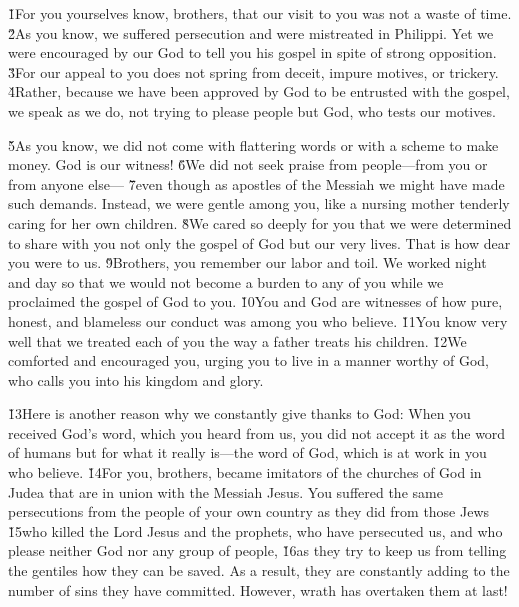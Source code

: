 \v{1}For you yourselves know, brothers, that our visit to you was not a waste of time. \v{2}As you know, we suffered persecution and were mistreated in Philippi. Yet we were encouraged by our God to tell you his gospel in spite of strong opposition. \v{3}For our appeal to you does not spring from deceit, impure motives, or trickery. \v{4}Rather, because we have been approved by God to be entrusted with the gospel, we speak as we do, not trying to please people but God, who tests our motives.

\v{5}As you know, we did not come with flattering words or with a scheme to make money. God is our witness! \v{6}We did not seek praise from people---from you or from anyone else--- \v{7}even though as apostles of the Messiah we might have made such demands. Instead, we were gentle among you, like a nursing mother tenderly caring for her own children. \v{8}We cared so deeply for you that we were determined to share with you not only the gospel of God but our very lives. That is how dear you were to us. \v{9}Brothers, you remember our labor and toil. We worked night and day so that we would not become a burden to any of you while we proclaimed the gospel of God to you. \v{10}You and God are witnesses of how pure, honest, and blameless our conduct was among you who believe. \v{11}You know very well that we treated each of you the way a father treats his children. \v{12}We comforted and encouraged you, urging you to live in a manner worthy of God, who calls you into his kingdom and glory.

\v{13}Here is another reason why we constantly give thanks to God: When you received God's word, which you heard from us, you did not accept it as the word of humans but for what it really is---the word of God, which is at work in you who believe. \v{14}For you, brothers, became imitators of the churches of God in Judea that are in union with the Messiah Jesus. You suffered the same persecutions from the people of your own country as they did from those Jews \v{15}who killed the Lord Jesus and the prophets, who have persecuted us, and who please neither God nor any group of people, \v{16}as they try to keep us from telling the gentiles how they can be saved. As a result, they are constantly adding to the number of sins they have committed. However, wrath has overtaken them at last!


